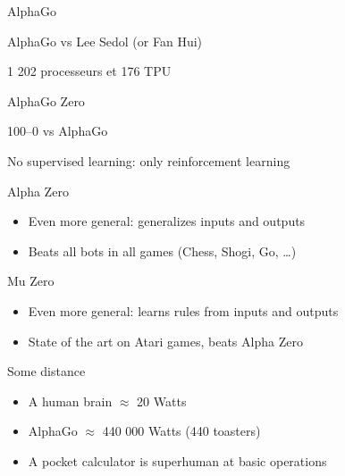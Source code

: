 \begin{frame}{AlphaGo}
  \begin{center}
    AlphaGo vs Lee Sedol (or Fan Hui)
  \end{center}
  \huge
  1 202 processeurs et 176 TPU
\end{frame}

\begin{frame}{AlphaGo Zero}
  \begin{description}[<+->]
    \item[Stronger] 100--0 vs AlphaGo
    \item[More general] No supervised learning: only reinforcement learning
  \end{description}

\end{frame}

\begin{frame}{Alpha Zero}
  \begin{itemize}[<+->]
    \item Even more general: generalizes inputs and outputs
    \item Beats all bots in all games (Chess, Shogi, Go, …)
  \end{itemize}  
\end{frame}

\begin{frame}{Mu Zero}
  \begin{itemize}[<+->]
    \item Even more general: learns rules from inputs and outputs
    \item State of the art on Atari games, beats Alpha Zero
  \end{itemize}
\end{frame}

\begin{frame}{Some distance}
  \begin{itemize}[<+->]
    \item A human brain $\approx$ 20 Watts
    \item AlphaGo $\approx$ 440 000 Watts (440 toasters)
    \item A pocket calculator is superhuman at basic operations
  \end{itemize}
\end{frame}
